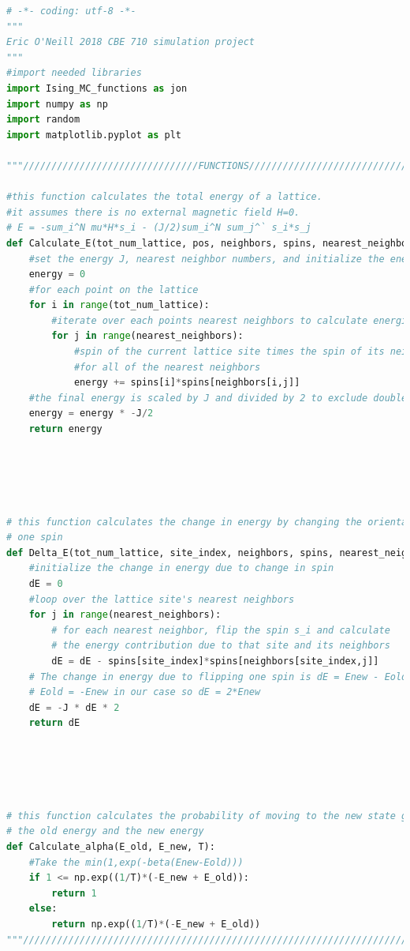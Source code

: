 \documentclass{article}
\begin{document}
\begin{lstlisting}[language=Python]
# -*- coding: utf-8 -*-
"""
Eric O'Neill 2018 CBE 710 simulation project
"""
#import needed libraries
import Ising_MC_functions as jon
import numpy as np
import random
import matplotlib.pyplot as plt

"""///////////////////////////////FUNCTIONS/////////////////////////////////"""

#this function calculates the total energy of a lattice.
#it assumes there is no external magnetic field H=0.
# E = -sum_i^N mu*H*s_i - (J/2)sum_i^N sum_j^` s_i*s_j
def Calculate_E(tot_num_lattice, pos, neighbors, spins, nearest_neighbors, J):
    #set the energy J, nearest neighbor numbers, and initialize the energy
    energy = 0
    #for each point on the lattice 
    for i in range(tot_num_lattice):
        #iterate over each points nearest neighbors to calculate energies
        for j in range(nearest_neighbors):
            #spin of the current lattice site times the spin of its neighbor
            #for all of the nearest neighbors
            energy += spins[i]*spins[neighbors[i,j]]
    #the final energy is scaled by J and divided by 2 to exclude double counting
    energy = energy * -J/2
    return energy





# this function calculates the change in energy by changing the orientation of 
# one spin
def Delta_E(tot_num_lattice, site_index, neighbors, spins, nearest_neighbors, J):
    #initialize the change in energy due to change in spin
    dE = 0
    #loop over the lattice site's nearest neighbors
    for j in range(nearest_neighbors):
        # for each nearest neighbor, flip the spin s_i and calculate 
        # the energy contribution due to that site and its neighbors
        dE = dE - spins[site_index]*spins[neighbors[site_index,j]]
    # The change in energy due to flipping one spin is dE = Enew - Eold
    # Eold = -Enew in our case so dE = 2*Enew    
    dE = -J * dE * 2
    return dE





# this function calculates the probability of moving to the new state given 
# the old energy and the new energy
def Calculate_alpha(E_old, E_new, T):
    #Take the min(1,exp(-beta(Enew-Eold)))
    if 1 <= np.exp((1/T)*(-E_new + E_old)):
        return 1
    else:
        return np.exp((1/T)*(-E_new + E_old))
"""/////////////////////////////////////////////////////////////////////////"""





\end{lstlisting}
\end{document}
